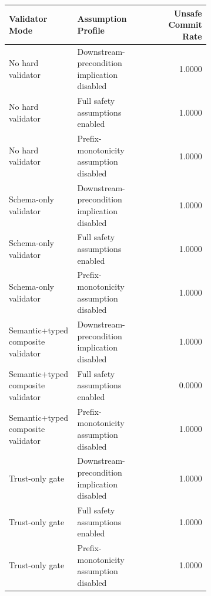 \begin{tabular}{p{0.34\linewidth}p{0.34\linewidth}r}
\hline
Validator Mode & Assumption Profile & Unsafe Commit Rate \\
\hline
No hard validator & Downstream-precondition implication disabled & 1.0000 \\
No hard validator & Full safety assumptions enabled & 1.0000 \\
No hard validator & Prefix-monotonicity assumption disabled & 1.0000 \\
Schema-only validator & Downstream-precondition implication disabled & 1.0000 \\
Schema-only validator & Full safety assumptions enabled & 1.0000 \\
Schema-only validator & Prefix-monotonicity assumption disabled & 1.0000 \\
Semantic+typed composite validator & Downstream-precondition implication disabled & 1.0000 \\
Semantic+typed composite validator & Full safety assumptions enabled & 0.0000 \\
Semantic+typed composite validator & Prefix-monotonicity assumption disabled & 1.0000 \\
Trust-only gate & Downstream-precondition implication disabled & 1.0000 \\
Trust-only gate & Full safety assumptions enabled & 1.0000 \\
Trust-only gate & Prefix-monotonicity assumption disabled & 1.0000 \\
\hline
\end{tabular}
